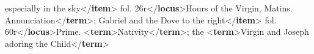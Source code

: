 \begin{shaded}
\hspace*{1em}\hspace*{1em}\hspace*{1em}\hspace*{1em}\hspace*{1em}\hspace*{1em}\hspace*{1em}\hspace*{1em} especially in the sky{</\textbf{item}>}\mbox{}\newline 
\hspace*{1em}\hspace*{1em}\hspace*{1em}\mbox{}\newline 
\hspace*{1em}\hspace*{1em}\hspace*{1em}\hspace*{1em}fol. 26r{</\textbf{locus}>}Hours of the Virgin, Matins.\mbox{}\newline 
\hspace*{1em}\hspace*{1em}\hspace*{1em}Annunciation{</\textbf{term}>}; Gabriel and the Dove to the right{</\textbf{item}>}\mbox{}\newline 
\hspace*{1em}\hspace*{1em}\hspace*{1em}\mbox{}\newline 
\hspace*{1em}\hspace*{1em}\hspace*{1em}\hspace*{1em}fol. 60r{</\textbf{locus}>}Prime. {<\textbf{term}>}Nativity{</\textbf{term}>}; the {<\textbf{term}>}Virgin and\mbox{}\newline 
\hspace*{1em}\hspace*{1em}\hspace*{1em}\hspace*{1em}\hspace*{1em}\hspace*{1em}\hspace*{1em}\hspace*{1em}\hspace*{1em}\hspace*{1em} Joseph adoring the Child{</\textbf{term}>}\mbox{}\newline 

\end{shaded}
